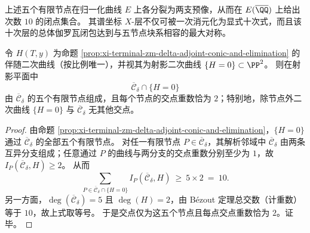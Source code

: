 上述五个有限节点在归一化曲线 \(E\) 上各分裂为两支预像，从而在 \(E(\overline{\QQ})\) 上给出次数 \(10\) 的闭点集合。
其谱坐标 \(X\)-层不仅可被一次消元化为显式十次式，而且该十次层的总体伽罗瓦闭包达到与五节点块系相容的最大对称。

\begin{theorem}\label{thm:xi-terminal-zm-delta-adjoint-conic-pure-nodal-intersection}
令 \(H(T,y)\) 为命题 \ref{prop:xi-terminal-zm-delta-adjoint-conic-and-elimination} 的伴随二次曲线（按比例唯一），并视其为射影二次曲线 \(\{H=0\}\subset\PP^2\)。
则在射影平面中
\[
\overline{\mathcal C}_\delta\cap\{H=0\}
\]
由 \(\overline{\mathcal C}_\delta\) 的五个有限节点组成，且每个节点的交点重数恰为 \(2\)；特别地，除节点外二次曲线 \(\{H=0\}\) 与 \(\overline{\mathcal C}_\delta\) 无其他交点。
\end{theorem}
\begin{proof}
由命题 \ref{prop:xi-terminal-zm-delta-adjoint-conic-and-elimination}，\(\{H=0\}\) 通过 \(\overline{\mathcal C}_\delta\) 的全部五个有限节点。
对任一有限节点 \(P\in\overline{\mathcal C}_\delta\)，其解析邻域中 \(\overline{\mathcal C}_\delta\) 由两条互异分支组成；任意通过 \(P\) 的曲线与两分支的交点重数分别至少为 \(1\)，故
\(
I_P(\overline{\mathcal C}_\delta,H)\ge 2
\)。
从而
\[
\sum_{P\in \overline{\mathcal C}_\delta\cap\{H=0\}} I_P(\overline{\mathcal C}_\delta,H)\ \ge\ 5\times 2\ =\ 10.
\]
另一方面，\(\deg(\overline{\mathcal C}_\delta)=5\) 且 \(\deg(H)=2\)，由 Bézout 定理总交数（计重数）等于 \(10\)，故上式取等号。
于是交点仅为这五个节点且每点交点重数恰为 \(2\)。证毕。
\end{proof}

